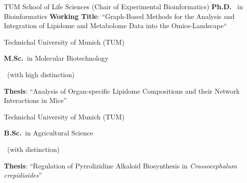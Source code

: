 {%
	TUM School of Life Sciences (Chair of Experimental Bioinformatics)%
}
{%
	\textbf{Ph.D.}~ in Bioinformatics%
}
{%
	\vspace{.1cm}
	\textbf{Working Title}: ``Graph-Based Methods for the Analysis and Integration of Lipidome and Metabolome Data into the Omics-Landscape``%
}

{%
	Technichal University of Munich (TUM)%
}
{%
	\textbf{M.Sc.}~in Molecular Biotechnology
	\begin{footnotesize}
		~(with high distinction)
	\end{footnotesize}%
}
{%
	\vspace{.1cm}
	\textbf{Thesis}: ``Analysis of Organ-specific Lipidome Compositions and their Network Interactions in Mice''%
}

{%
	Technichal University of Munich (TUM)%
}
{%
	\textbf{B.Sc.}~in Agricultural Science%
	\begin{footnotesize}
		~(with distinction)
	\end{footnotesize}%
}
{%
	\vspace{.1cm}
	\textbf{Thesis}: ``Regulation of Pyrrolizidine Alkaloid Biosynthesis in \textit{Crassocephalum crepidioides}''%
}
